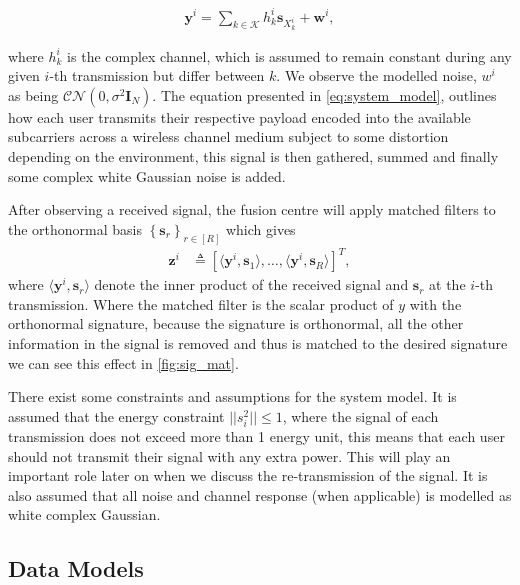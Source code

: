 \documentclass{article}
\begin{document}
\begin{align}
    \boldsymbol{y}^i = \sum_{k \in \mathcal{K}} h^i_k \boldsymbol{s}_{X^i_k} + \boldsymbol{w}^i, \label{eq:system_model}
\end{align}

where $h_k^i$ is the complex channel, which is assumed to remain constant during any given $i$-th transmission but differ between $k$. We observe the modelled noise, $w^i$ as being $\mathcal{CN}(0, \sigma^2 \boldsymbol{I}_N)$. The equation presented in \cref{eq:system_model}, outlines how each user transmits their respective payload encoded into the available subcarriers across a wireless channel medium subject to some distortion depending on the environment, this signal is then gathered, summed and finally some complex white Gaussian noise is added.


After observing a received signal, the fusion centre will apply matched filters to the orthonormal basis $\left\{ \boldsymbol{s}_r\right\}_{r \in [R]}$ which gives
%
\begin{align}
    \boldsymbol{z}^i &\triangleq \left[\langle \boldsymbol{y}^i, \boldsymbol{s}_1\rangle, \ldots, \langle \boldsymbol{y}^i, \boldsymbol{s}_R\rangle  \right]^T, \label{eq:mf_output}
\end{align}
%
where $\langle \boldsymbol{y}^i, \boldsymbol{s}_r\rangle$ denote the inner product of the received signal and $\boldsymbol{s}_r$ at the $i$-th transmission. Where the matched filter is the scalar product of $y$ with the orthonormal signature, because the signature is orthonormal, all the other information in the signal is removed and thus is matched to the desired signature we can see this effect in \cref{fig:sig_mat}. 

There exist some constraints and assumptions for the system model. It is assumed that the energy constraint $||s_{i}^2|| \leq 1$, where the signal of each transmission does not exceed more than 1 energy unit, this means that each user should not transmit their signal with any extra power. This will play an important role later on when we discuss the re-transmission of the signal. It is also assumed that all noise and channel response (when applicable) is modelled as white complex Gaussian.   
\subsection{Data Models}\label{data_models}
\end{document}
